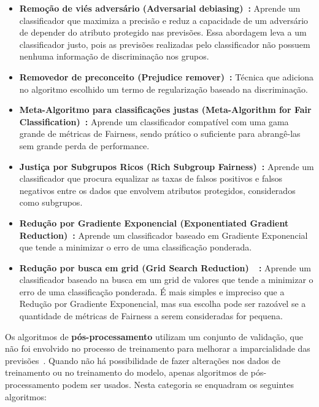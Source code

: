 \documentclass[portugues]{ic-tese}
\begin{document}
\begin{itemize}
\item \textbf{Remoção de viés adversário (Adversarial debiasing)~\citep{Zhang_2018}:} Aprende um classificador que maximiza a precisão e reduz a capacidade de um adversário de depender do atributo protegido nas previsões. Essa abordagem leva a um classificador justo, pois as previsões realizadas pelo classificador não possuem nenhuma informação de discriminação nos grupos.

\item \textbf{Removedor de preconceito (Prejudice remover)~\citep{Feldman_2015}:} Técnica que adiciona no algoritmo escolhido um termo de regularização baseado na discriminação.

\item \textbf{Meta-Algoritmo para classificações justas (Meta-Algorithm for Fair Classification)~\citep{Celis_2019}:} Aprende um classificador compatível com uma gama grande de métricas de Fairness, sendo prático o suficiente para abrangê-las sem grande perda de performance.

\item \textbf{Justiça por Subgrupos Ricos (Rich Subgroup Fairness)~\citep{Kearns_2018}:} Aprende um classificador que procura equalizar as taxas de falsos positivos e falsos negativos entre os dados que envolvem atributos protegidos, considerados como subgrupos.

\item \textbf{Redução por Gradiente Exponencial (Exponentiated Gradient Reduction)~\citep{Agarwal_2018}:} Aprende um classificador baseado em Gradiente Exponencial que tende a minimizar o erro de uma classificação ponderada.

\item \textbf{Redução por busca em grid (Grid Search Reduction)~\citep{Agarwal_2018}~\citep{Agarwal_2019}:} Aprende um classificador baseado na busca em um grid de valores que tende a minimizar o erro de uma classificação ponderada. É mais simples e impreciso que a Redução por Gradiente Exponencial, mas sua escolha pode ser razoável se a quantidade de métricas de Fairness a serem consideradas for pequena.

\end{itemize}

Os algoritmos de \textbf{pós-processamento} utilizam um conjunto de validação, que não foi envolvido no processo de treinamento para melhorar a imparcialidade das previsões~\citep{dAlessandro_2017}. Quando não há possibilidade de fazer alterações nos dados de treinamento ou no treinamento do modelo, apenas algoritmos de pós-processamento podem ser usados. Nesta categoria se enquadram os seguintes algoritmos:
\end{document}
